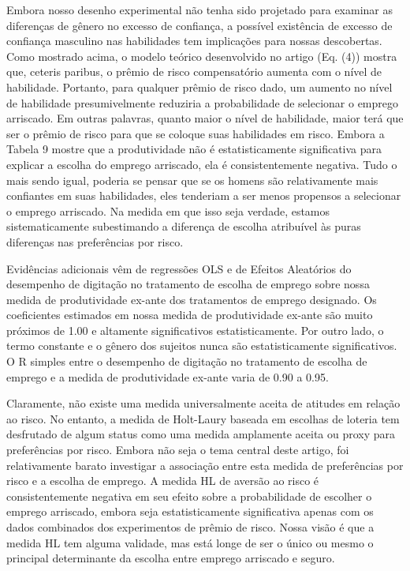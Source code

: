 \documentclass[a4paper,12pt]{article}[abntex2]
\begin{document}
Embora nosso desenho experimental não tenha sido projetado para examinar as diferenças de gênero no excesso de confiança, a possível existência de excesso de confiança masculino nas habilidades tem implicações para nossas descobertas. Como mostrado acima, o modelo teórico desenvolvido no artigo (Eq. (4)) mostra que, ceteris paribus, o prêmio de risco compensatório aumenta com o nível de habilidade. Portanto, para qualquer prêmio de risco dado, um aumento no nível de habilidade presumivelmente reduziria a probabilidade de selecionar o emprego arriscado. Em outras palavras, quanto maior o nível de habilidade, maior terá que ser o prêmio de risco para que se coloque suas habilidades em risco. Embora a Tabela 9 mostre que a produtividade não é estatisticamente significativa para explicar a escolha do emprego arriscado, ela é consistentemente negativa. Tudo o mais sendo igual, poderia se pensar que se os homens são relativamente mais confiantes em suas habilidades, eles tenderiam a ser menos propensos a selecionar o emprego arriscado. Na medida em que isso seja verdade, estamos sistematicamente subestimando a diferença de escolha atribuível às puras diferenças nas preferências por risco.

Evidências adicionais vêm de regressões OLS e de Efeitos Aleatórios do desempenho de digitação no tratamento de escolha de emprego sobre nossa medida de produtividade ex-ante dos tratamentos de emprego designado. Os coeficientes estimados em nossa medida de produtividade ex-ante são muito próximos de 1.00 e altamente significativos estatisticamente. Por outro lado, o termo constante e o gênero dos sujeitos nunca são estatisticamente significativos. O R simples entre o desempenho de digitação no tratamento de escolha de emprego e a medida de produtividade ex-ante varia de 0.90 a 0.95.

Claramente, não existe uma medida universalmente aceita de atitudes em relação ao risco. No entanto, a medida de Holt-Laury baseada em escolhas de loteria tem desfrutado de algum status como uma medida amplamente aceita ou proxy para preferências por risco. Embora não seja o tema central deste artigo, foi relativamente barato investigar a associação entre esta medida de preferências por risco e a escolha de emprego. A medida HL de aversão ao risco é consistentemente negativa em seu efeito sobre a probabilidade de escolher o emprego arriscado, embora seja estatisticamente significativa apenas com os dados combinados dos experimentos de prêmio de risco. Nossa visão é que a medida HL tem alguma validade, mas está longe de ser o único ou mesmo o principal determinante da escolha entre emprego arriscado e seguro.
\end{document}
